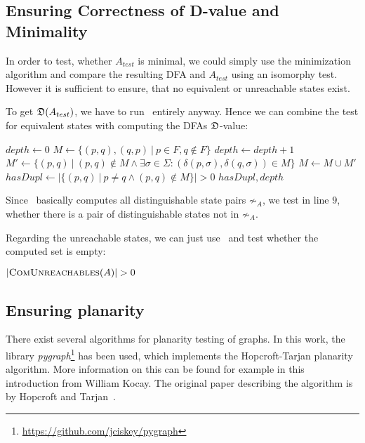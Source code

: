 \subsection{Ensuring Correctness of D-value and Minimality}

In order to test, whether $A_{test}$ is minimal, we could simply use the minimization algorithm and compare the resulting DFA and $A_{test}$ using an isomorphy test. However it is sufficient to ensure, that no equivalent or unreachable states exist.

To get $\mathfrak{D}(A_{test})$, we have to run \CompDist\ entirely anyway. Hence we can combine the test for equivalent states with computing the DFAs $\mathfrak{D}$-value:
\vspace{0.2cm}
\begin{algorithmic}[1]
		\State $depth \gets 0$ 
		\State $M \gets \{ (p,q), (q,p)\ |\ p \in F, q \notin F \}$
		\Do
			\State $depth \gets depth + 1$
			\State $M' \gets \{ (p,q)\ |\ (p,q) \notin M \land \exists \sigma \in \Sigma \colon (\delta(p,\sigma), \delta(q,\sigma)) \in M \}$
			\State $M \gets M \cup M'$
		\State $hasDupl \gets | \{ (p,q)\ |\ p \neq q \land (p,q) \notin M \} | > 0$
		\State \Return $hasDupl, depth$
	\EndFunction
\end{algorithmic}
\vspace{0.2cm}
Since \CompDist\ basically computes all distinguishable state pairs $\not\sim_A$, we test in line $9$, whether there is a pair of distinguishable states not in $\not\sim_A$.

Regarding the unreachable states, we can just use \CompUnr\ and test whether the computed set is empty:
\vspace{0.2cm}
\begin{algorithmic}[1]
	\State \Return $|\textsc{ComUnreachables}(A)| > 0$
	\EndFunction
\end{algorithmic}

\subsection{Ensuring planarity}

There exist several algorithms for planarity testing of graphs. In this work, the library \emph{pygraph}\footnote{\url{https://github.com/jciskey/pygraph}} has been used, which implements the Hopcroft-Tarjan planarity algorithm. More information on this can be found for example in this~\cite{Koc93} introduction from William Kocay. The original paper describing the algorithm is by Hopcroft and Tarjan~\cite{HT74}.


